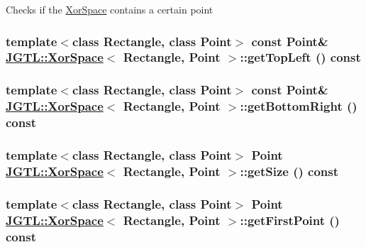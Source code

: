 Checks if the \hyperlink{class_j_g_t_l_1_1_xor_space}{Xor\-Space} contains a certain point \hypertarget{class_j_g_t_l_1_1_xor_space_cb61e4508a4df0ab8dc83db8ce75140a}{
\subsubsection[getTopLeft]{\setlength{\rightskip}{0pt plus 5cm}template$<$class Rectangle, class Point$>$ const Point\& \hyperlink{class_j_g_t_l_1_1_xor_space}{JGTL::Xor\-Space}$<$ Rectangle, Point $>$::get\-Top\-Left () const}}
\label{class_j_g_t_l_1_1_xor_space_cb61e4508a4df0ab8dc83db8ce75140a}


\hypertarget{class_j_g_t_l_1_1_xor_space_20f62e7360534b0d7f9945acc99627d1}{
\subsubsection[getBottomRight]{\setlength{\rightskip}{0pt plus 5cm}template$<$class Rectangle, class Point$>$ const Point\& \hyperlink{class_j_g_t_l_1_1_xor_space}{JGTL::Xor\-Space}$<$ Rectangle, Point $>$::get\-Bottom\-Right () const}}
\label{class_j_g_t_l_1_1_xor_space_20f62e7360534b0d7f9945acc99627d1}


\hypertarget{class_j_g_t_l_1_1_xor_space_497ef0f83c9d2b6cdc10c4b297fd6e4f}{
\subsubsection[getSize]{\setlength{\rightskip}{0pt plus 5cm}template$<$class Rectangle, class Point$>$ Point \hyperlink{class_j_g_t_l_1_1_xor_space}{JGTL::Xor\-Space}$<$ Rectangle, Point $>$::get\-Size () const}}
\label{class_j_g_t_l_1_1_xor_space_497ef0f83c9d2b6cdc10c4b297fd6e4f}


\hypertarget{class_j_g_t_l_1_1_xor_space_fc844c1202940bc5340cf01a4431cbab}{
\subsubsection[getFirstPoint]{\setlength{\rightskip}{0pt plus 5cm}template$<$class Rectangle, class Point$>$ Point \hyperlink{class_j_g_t_l_1_1_xor_space}{JGTL::Xor\-Space}$<$ Rectangle, Point $>$::get\-First\-Point () const}}
\label{class_j_g_t_l_1_1_xor_space_fc844c1202940bc5340cf01a4431cbab}


